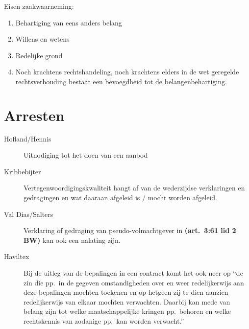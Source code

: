 \documentclass[a4paper]{article}
\newcommand{\art}[1]{\textbf{(art.~#1 BW)}\xspace}
\begin{document}
Eisen zaakwaarneming:
\begin{enumerate}
  \item Behartiging van eens anders belang
  \item Willens en wetens
  \item Redelijke grond
  \item Noch krachtens rechtshandeling, noch krachtens elders in de wet
    geregelde rechtsverhouding bestaat een bevoegdheid tot de
    belangenbehartiging.
\end{enumerate}

\section{Arresten}

\begin{description}

  \item[Hofland/Hennis] Uitnodiging tot het doen van een aanbod

  \item[Kribbebijter] Vertegenwoordigingskwaliteit hangt af van de wederzijdse
    verklaringen en gedragingen en wat daaraan afgeleid is / mocht worden
    afgeleid.

  \item[Val Dias/Salters] Verklaring of gedraging van pseudo-volmachtgever in
    \art{3:61 lid 2} kan ook een nalating zijn.

  \item[Haviltex] Bij de uitleg van de bepalingen in een contract komt het ook
    neer op ``de zin die pp.~in de gegeven omstandigheden over en weer
    redelijkerwijs aan deze bepalingen mochten toekenen en op hetgeen zij te
    dien aanzien redelijkerwijs van elkaar mochten verwachten. Daarbij kan
    mede van belang zijn tot welke maatschappelijke kringen pp.~behoren en
    welke rechtskennis van zodanige pp.~kan worden verwacht.''

\end{description}
\end{document}
